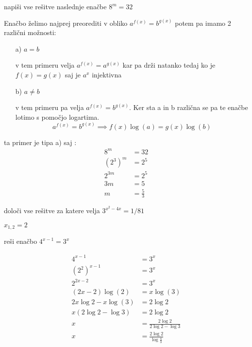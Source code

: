 \begin{vaja}
  napiši vse rešitve naslednje enačbe \( 8^m=32\)

  \begin{odgovor}
   Enačbo želimo najprej  preorediti v obliko $a^{f(x)}=b^{g(x)}$ potem pa imamo 2 različni možnosti:
	\begin{itemize}
		\item[a)] $a=b$ 

			v tem primeru velja $a^{f(x)}=a^{g(x)}$ kar pa drži natanko tedaj ko je $f(x)=g(x)$ saj je $a^x$ injektivna
			
		\item[b)] $a\neq b$
			
			v tem primeru pa velja $a^{f(x)}=b^{g(x)}$. Ker sta a in b različna se pa te enačbe lotimo s pomočjo logartima.
			$$a^{f(x)}=b^{g(x)}\implies f(x)\log(a)=g(x)\log(b)$$
	\end{itemize}
	
	ta primer je tipa a) saj :
	\begin{align*}
		8^m&=32\\
		(2^3)^m&=2^5\\
		2^{3m}&=2^5\\
		3m&=5\\
		m&=\frac{5}{3}
	\end{align*}
  \end{odgovor}
\end{vaja}


\begin{vaja}
	določi vse rešitve za katere velja \(3^{x^2-4x}=1/81\)
  \begin{odgovor}$x_{1,2}=2$
  \end{odgovor}
\end{vaja}


\begin{vaja}
  reši enačbo $4^{x-1}=3^x$

  \begin{odgovor}
	\begin{align*}
	 4^{x-1}&=3^x\\
	 (2^2)^{x-1}&=3^x\\
	 2^{2x-2}&=3^x\\
	 (2x-2)\log(2)&=x\log(3)\\
	 2x\log2-x\log(3)&=2\log2\\
	 x(2\log2-\log3)&=2\log2\\
	 x&=\frac{2\log2}{2\log2-\log3}\\
	 x&=\frac{2\log2}{\log{\frac{4}{3}}}
	\end{align*}    
  \end{odgovor}
\end{vaja}


